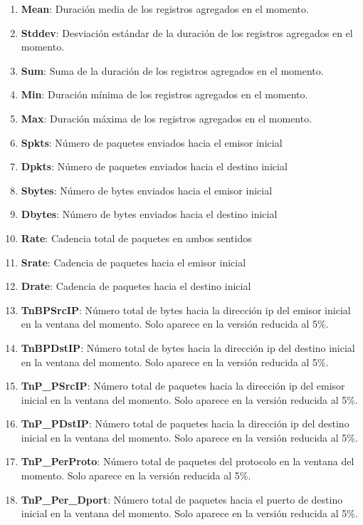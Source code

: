 \begin{enumerate}
    \item \textbf{Mean}: Duración media de los registros agregados en el momento.
    \item \textbf{Stddev}: Desviación estándar de la duración de los registros agregados en el momento.
    \item \textbf{Sum}: Suma de la duración de los registros agregados en el momento.
    \item \textbf{Min}: Duración mínima de los registros agregados en el momento.
    \item \textbf{Max}: Duración máxima de los registros agregados en el momento.
    \item \textbf{Spkts}: Número de paquetes enviados hacia el emisor inicial
    \item \textbf{Dpkts}: Número de paquetes enviados hacia el destino inicial
    \item \textbf{Sbytes}: Número de bytes enviados hacia el emisor inicial
    \item \textbf{Dbytes}: Número de bytes enviados hacia el destino inicial
    \item \textbf{Rate}: Cadencia total de paquetes en ambos sentidos
    \item \textbf{Srate}: Cadencia de paquetes hacia el emisor inicial
    \item \textbf{Drate}: Cadencia de paquetes hacia el destino inicial
    \item \textbf{TnBPSrcIP}: Número total de bytes hacia la dirección \acrshort{ip} del emisor inicial en la ventana del momento. Solo aparece en la versión reducida al 5\%.
    \item \textbf{TnBPDstIP}: Número total de bytes hacia la dirección \acrshort{ip} del destino inicial en la ventana del momento. Solo aparece en la versión reducida al 5\%.
    \item \textbf{TnP\_PSrcIP}: Número total de paquetes hacia la dirección \acrshort{ip} del emisor inicial en la ventana del momento. Solo aparece en la versión reducida al 5\%.
    \item \textbf{TnP\_PDstIP}: Número total de paquetes hacia la dirección \acrshort{ip} del destino inicial en la ventana del momento. Solo aparece en la versión reducida al 5\%.
    \item \textbf{TnP\_PerProto}: Número total de paquetes del protocolo en la ventana del momento. Solo aparece en la versión reducida al 5\%.
    \item \textbf{TnP\_Per\_Dport}: Número total de paquetes hacia el puerto de destino inicial en la ventana del momento. Solo aparece en la versión reducida al 5\%.

\end{enumerate}
